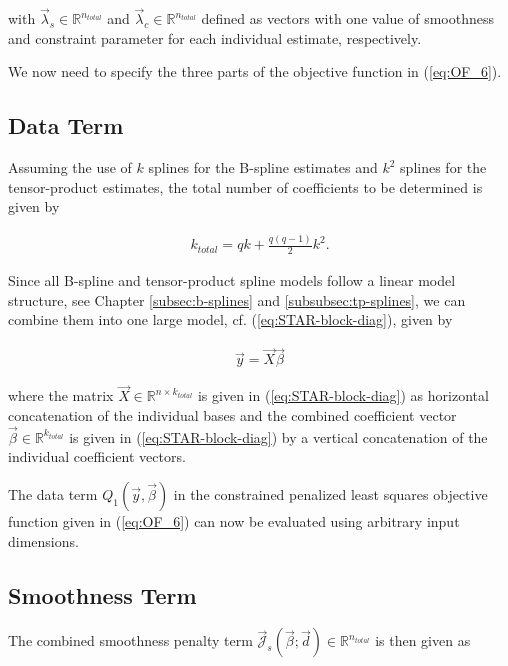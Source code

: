 with $\vec{\lambda}_s \in \mathbb{R}^{n_{total}}$ and  $\vec{\lambda}_c \in \mathbb{R}^{n_{total}}$  defined as vectors with one value of smoothness and constraint parameter for each individual estimate, respectively. 

We now need to specify the three parts of the objective function in (\ref{eq:OF_6}). 

\subsection{Data Term}

Assuming the use of $k$ splines for the B-spline estimates and $k^2$ splines for the tensor-product estimates, the total number of coefficients to be determined is given by 

\begin{align}\label{eq:tps_total_number_of_coef}
	k_{total} = qk + \frac{q(q-1)}{2}k^2. 
\end{align}

Since all B-spline and tensor-product spline models follow a linear model structure, see Chapter \ref{subsec:b-splines} and \ref{subsubsec:tp-splines}, we can combine them into one large model, cf. (\ref{eq:STAR-block-diag}), given by

\begin{align}\label{eq:tps_lin_mod}
	\vec{y} = \vec{X} \vec{\beta}
\end{align}

where the matrix $\vec{X} \in \mathbb{R}^{n \times k_{total}}$ is given in (\ref{eq:STAR-block-diag}) as horizontal concatenation of the individual bases and the combined coefficient vector $\vec{\beta} \in \mathbb{R}^{k_{total}}$ is given in (\ref{eq:STAR-block-diag}) by a vertical concatenation of the individual coefficient vectors. 

The data term $Q_1(\vec{y}, \vec{\beta})$ in the constrained penalized least squares objective function given in (\ref{eq:OF_6}) can now be evaluated using arbitrary input dimensions. 

\subsection{Smoothness Term}

The combined smoothness penalty term $\vec{\mathcal{J}}_s(\vec{\beta}; \vec{d}) \in \mathbb{R}^{n_{total}}$ is then given as

